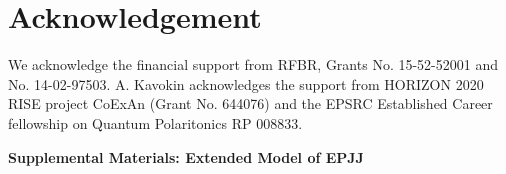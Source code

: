 \documentclass[aps, pre, preprint, groupedaddress, superscriptaddress, showkeys, showpacs] {revtex4-1}
\begin{document}
{{{\section{Acknowledgement
\label{sec:acknowledgement}}
We acknowledge the financial support from RFBR, Grants No. 15-52-52001 and No. 14-02-97503.
A. Kavokin acknowledges the support from HORIZON 2020 RISE project CoExAn (Grant No. 644076) and the EPSRC Established Career fellowship on Quantum Polaritonics RP 008833.


\pagebreak
\widetext
\begin{center}
\textbf{Supplemental Materials: Extended  Model of EPJJ}
\end{center}

\setcounter{equation}{0}
\makeatletter
\renewcommand{\theequation}{S\arabic{equation}}
\renewcommand{\thefigure}{S\arabic{figure}}
\renewcommand{\citenumfont}[1]{S#1}

}}}
\end{document}
